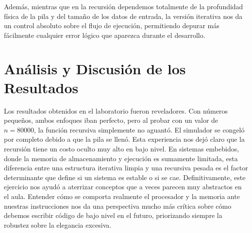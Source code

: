 \documentclass[12pt,letterpaper]{article}
\begin{document}
Además, mientras que en la recursión dependemos totalmente de la profundidad física de la pila y del tamaño de los datos de entrada, la versión iterativa nos da un control absoluto sobre el flujo de ejecución, permitiendo depurar más fácilmente cualquier error lógico que aparezca durante el desarrollo.

\section{Análisis y Discusión de los Resultados}
Los resultados obtenidos en el laboratorio fueron reveladores. Con números pequeños, ambos enfoques iban perfecto, pero al probar con un valor de $n=80000$, la función recursiva simplemente no aguantó. El simulador se congeló por completo debido a que la pila se llenó. Esta experiencia nos dejó claro que la recursión tiene un costo oculto muy alto en bajo nivel. En sistemas embebidos, donde la memoria de almacenamiento y ejecución es sumamente limitada, esta diferencia entre una estructura iterativa limpia y una recursiva pesada es el factor determinante que define si un sistema es estable o si se cae. Definitivamente, este ejercicio nos ayudó a aterrizar conceptos que a veces parecen muy abstractos en el aula. Entender cómo se comporta realmente el procesador y la memoria ante nuestras instrucciones nos da una perspectiva mucho más crítica sobre cómo debemos escribir código de bajo nivel en el futuro, priorizando siempre la robustez sobre la elegancia excesiva.
\end{document}
